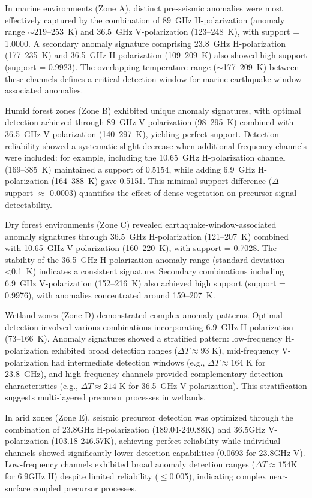 \documentclass[preprint,review,12pt,authoryear]{elsarticle}
\begin{document}
In marine environments (Zone A), distinct pre-seismic anomalies were most effectively captured by the combination of 89~GHz H-polarization (anomaly range $\sim$219--253~K) and 36.5~GHz V-polarization (123--248~K), with support = 1.0000. A secondary anomaly signature comprising 23.8~GHz H-polarization (177--235~K) and 36.5~GHz H-polarization (109--209~K) also showed high support (support = 0.9923). The overlapping temperature range ($\sim$177--209~K) between these channels defines a critical detection window for marine earthquake-window-associated anomalies.

Humid forest zones (Zone B) exhibited unique anomaly signatures, with optimal detection achieved through 89~GHz V-polarization (98--295~K) combined with 36.5~GHz V-polarization (140--297~K), yielding perfect support. Detection reliability showed a systematic slight decrease when additional frequency channels were included: for example, including the 10.65~GHz H-polarization channel (169--385~K) maintained a support of 0.5154, while adding 6.9~GHz H-polarization (164--388~K) gave 0.5151. This minimal support difference ($\Delta$support $\approx$ 0.0003) quantifies the effect of dense vegetation on precursor signal detectability.

Dry forest environments (Zone C) revealed earthquake-window-associated anomaly signatures through 36.5~GHz H-polarization (121--207~K) combined with 10.65~GHz V-polarization (160--220~K), with support = 0.7028. The stability of the 36.5~GHz H-polarization anomaly range (standard deviation <0.1~K) indicates a consistent signature. Secondary combinations including 6.9~GHz V-polarization (152--216~K) also achieved high support (support = 0.9976), with anomalies concentrated around 159--207~K.

Wetland zones (Zone D) demonstrated complex anomaly patterns. Optimal detection involved various combinations incorporating 6.9~GHz H-polarization (73--166~K). Anomaly signatures showed a stratified pattern: low-frequency H-polarization exhibited broad detection ranges ($\Delta T \approx 93$ K), mid-frequency V-polarization had intermediate detection windows (e.g., $\Delta T \approx 164$ K for 23.8~GHz), and high-frequency channels provided complementary detection characteristics (e.g., $\Delta T \approx 214$ K for 36.5~GHz V-polarization). This stratification suggests multi-layered precursor processes in wetlands.

In arid zones (Zone E), seismic precursor detection was optimized through the combination of 23.8GHz H-polarization (189.04-240.88K) and 36.5GHz V-polarization (103.18-246.57K), achieving perfect reliability while individual channels showed significantly lower detection capabilities (0.0693 for 23.8GHz V). Low-frequency channels exhibited broad anomaly detection ranges ($\Delta T \approx 154$K for 6.9GHz H) despite limited reliability ($\le$0.005), indicating complex near-surface coupled precursor processes.
\end{document}

